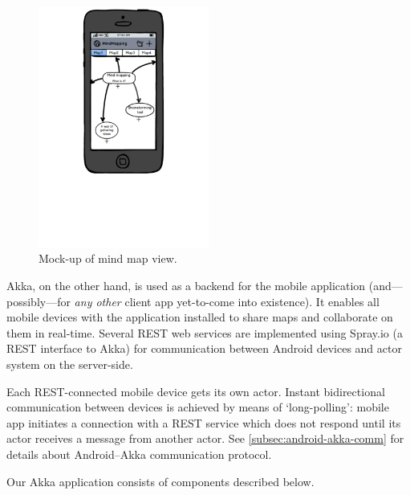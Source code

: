 \begin{figure}[h]
	\centering
	\includegraphics[width=0.5\textwidth]{graphics-mockup-map}
	\caption{Mock-up of mind map view.}
	\label{fig:mockup-mindmap}
\end{figure}


Akka, on the other hand, is used as a backend for the mobile application (and---possibly---for \emph{any other} client app yet-to-come into existence). It enables all mobile devices with the application installed to share maps and collaborate on them in real-time. Several REST web services are implemented using Spray.io (a REST interface to Akka) for communication between Android devices and actor system on the server-side.

Each REST-connected mobile device gets its own actor. Instant bidirectional communication between devices is achieved by means of `long-polling': mobile app initiates a connection with a REST service which does not respond until its actor receives a message from another actor. See \cref{subsec:android-akka-comm} for details about Android--Akka communication protocol.

Our Akka application consists of components described below.

